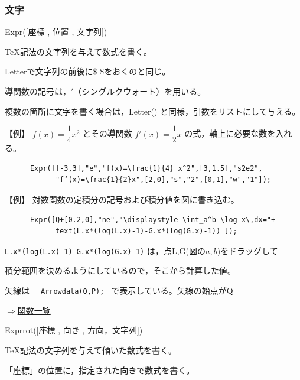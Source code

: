 \documentclass[papersize,a4paper,12pt,uplatex]{jsarticle}
\begin{document}
\subsubsection{文字}
\begin{description}

\vspace{\baselineskip}
\hypertarget{expr}{}
\item[関数]  Expr([座標 , 位置 , 文字列])
\item[機能]  \TeX 記法の文字列を与えて数式を書く。
\item[説明]  Letterで文字列の前後に\$ \$をおくのと同じ。

導関数の記号は，$'$（シングルクウォート）を用いる。

複数の箇所に文字を書く場合は，Letter() と同様，引数をリストにして与える。

\vspace{\baselineskip}
【例】  $f(x)=\dfrac{1}{4} x^2$  とその導関数 $f'(x)=\dfrac{1}{2} x$ の式，軸上に必要な数を入れる。
\begin{verbatim}
      Expr([[-3,3],"e","f(x)=\frac{1}{4} x^2",[3,1.5],"s2e2",
            "f‘(x)=\frac{1}{2}x",[2,0],"s","2",[0,1],"w","1"]);
\end{verbatim}
\vspace{\baselineskip}
          \begin{center} \end{center}

【例】  対数関数の定積分の記号および積分値を図に書き込む。
\begin{verbatim}
      Expr([Q+[0.2,0],"ne","\displaystyle \int_a^b \log x\,dx="+
            text(L.x*(log(L.x)-1)-G.x*(log(G.x)-1)) ]);
\end{verbatim}

 \verb|L.x*(log(L.x)-1)-G.x*(log(G.x)-1)| は，点L,G(図の$a,b$)をドラッグして
 
 積分範囲を決めるようにしているので，そこから計算した値。
 
 矢線は \verb|  Arrowdata(Q,P); | で表示している。矢線の始点がQ
\vspace{\baselineskip}
\begin{center} \end{center}

\begin{flushright}  \hyperlink{functionlist}{$\Rightarrow$関数一覧}\end{flushright}

\vspace{\baselineskip}
\hypertarget{exprrot}{}
\item[関数]  Exprrot([座標 , 向き , 方向，文字列])
\item[機能]  \TeX 記法の文字列を与えて傾いた数式を書く。
\item[説明]  「座標」の位置に，指定された向きで数式を書く。


\end{description}
\end{document}

